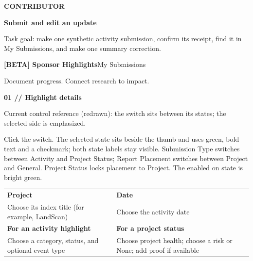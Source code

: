 \documentclass[letterpaper,10pt]{article}
\newcommand{\eyebrow}[1]{{\color{Green}\small\bfseries #1}\par\vspace{2pt}}
\newcommand{\titleline}[1]{{\color{Forest}\fontsize{22}{26}\selectfont\bfseries #1}\par\vspace{5pt}}
\newcommand{\subline}[1]{{\color{Muted}\small #1}\par\vspace{9pt}}
\begin{document}
\eyebrow{CONTRIBUTOR}
\titleline{Submit and edit an update}
\subline{Task goal: make one synthetic activity submission, confirm its receipt, find it in My Submissions, and make one summary correction.}

\begin{tcolorbox}[colback=Forest,colframe=Forest,arc=7pt,left=12pt,right=12pt,top=8pt,bottom=8pt]
{\color{white}\large\bfseries [BETA] Sponsor Highlights}\hfill {\color{white}\small My Submissions}\par
{\color{white}\small Document progress. Connect research to impact.}
\end{tcolorbox}

{\color{Green}\large\bfseries 01 // Highlight details}\par
{}\par
{\color{Muted}\scriptsize Current control reference (redrawn): the switch sits between its states; the selected side is emphasized.}\par
Click the switch. The selected state sits beside the thumb and uses green, bold text and a checkmark; both state labels stay visible. Submission Type switches between Activity and Project Status; Report Placement switches between Project and General. Project Status locks placement to Project. The enabled on state is bright green.\par
\begin{tabularx}{\linewidth}{@{}X X@{}}
\textbf{Project} & \textbf{Date}\\[4pt]
Choose its index title (for example, LandScan) & Choose the activity date\\[12pt]
\textbf{For an activity highlight} & \textbf{For a project status}\\[4pt]
Choose a category, status, and optional event type & Choose project health; choose a risk or None; add proof if available\\
\end{tabularx}
\end{document}
